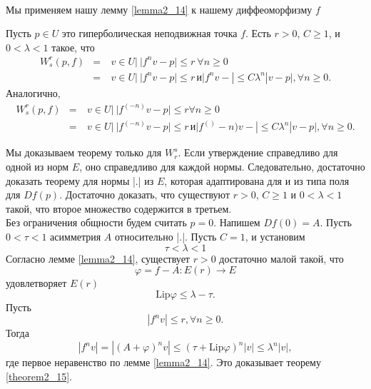 \\ 
Мы применяем нашу лемму \ref{lemma2_14} к нашему диффеоморфизму $f$
\begin{theorem}
\label{theorem2_15} Пусть $p \in U$ это гиперболическая неподвижная точка $f$. Есть $r > 0$, $C \geqslant 1$, и $0 < \lambda < 1$ такое, что
$$
\begin{array}{rclll}
W_s^r(p,f) & = & \ {v \in U | \ |f^n v - p| \leqslant r \ \forall n \geqslant 0 } \\
                   & = & \ {v \in U | \ |f^n v - p| \leqslant r \, и |f^n v - | \leqslant C \lambda^n|v - p|, \forall n \geqslant 0}.
\end{array} 
$$
Аналогично,
$$
\begin{array}{rclll}
W_s^r(p,f)         & = & \ {v \in U | \ |f^(-n) v - p| \leqslant r  \forall n \geqslant 0} \\
                   & = & \ {v \in U | \ |f^(-n) v - p| \leqslant r \, и |f^()-n) v - | \leqslant C \lambda^n|v - p|, \forall n \geqslant 0}.
\end{array} 
$$
\end{theorem}
\begin{demo}
Мы доказываем теорему только для $W_r^s$. Если утверждение справедливо для одной из норм $E$, оно справедливо для каждой нормы. Следовательно, достаточно доказать теорему для нормы |.| из $E$, которая адаптирована для и из типа поля для $Df(p)$. Достаточно доказать, что существуют $r > 0$, $C \geqslant 1$ и $ 0 < \lambda < 1$ такой, что второе множество содержится в третьем.
\\ Без ограничения общности будем считать $p = 0$. Напишем $Df(0) = A$. Пусть $0 < \tau < 1$ асимметрия $A$ относительно |.|. Пусть $C = 1$, и установим
$$
\tau < \lambda < 1
$$
Согласно лемме \ref{lemma2_14}, существует $r >0$ достаточно малой такой, что 
$$
\varphi = f - A : E(r) \to E
$$
удовлетворяет $E(r)$
$$
 \mathrm{Lip} \varphi \leqslant \lambda - \tau.
$$
Пусть
$$
|f^n v| \leqslant r, \forall n \geqslant 0.
$$
Тогда
$$
|f^n v| = |(A + \varphi)^n v| \leqslant (\tau +  \mathrm{Lip} \varphi)^n |v| \leqslant \lambda^n |v|,
$$
где первое неравенство по лемме \ref{lemma2_14}. Это доказывает теорему \ref{theorem2_15}.
\end{demo}

